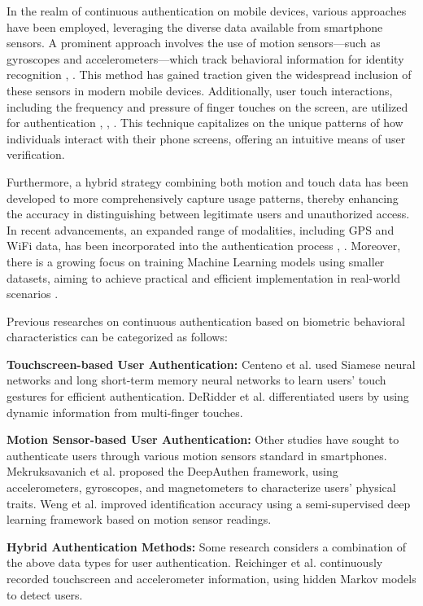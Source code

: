 In the realm of continuous authentication on mobile devices, various approaches have been employed, leveraging the diverse data available from smartphone sensors. A prominent approach involves the use of motion sensors—such as gyroscopes and accelerometers—which track behavioral information for identity recognition \cite{fereidooni2023authentisense}, \cite{centeno2018mobile}. This method has gained traction given the widespread inclusion of these sensors in modern mobile devices. Additionally, user touch interactions, including the frequency and pressure of finger touches on the screen, are utilized for authentication \cite{frank2012touchalytics}, \cite{xu2014towards}, \cite{zhao2013continuous}. This technique capitalizes on the unique patterns of how individuals interact with their phone screens, offering an intuitive means of user verification.

Furthermore, a hybrid strategy combining both motion and touch data has been developed to more comprehensively capture usage patterns, thereby enhancing the accuracy in distinguishing between legitimate users and unauthorized access. In recent advancements, an expanded range of modalities, including GPS and WiFi data, has been incorporated into the authentication process \cite{deb2019actions}, \cite{acien2019multilock}. Moreover, there is a growing focus on training Machine Learning models using smaller datasets, aiming to achieve practical and efficient implementation in real-world scenarios \cite{fereidooni2023authentisense}.


Previous researches on continuous authentication based on biometric behavioral characteristics can be categorized as follows:

\textbf{Touchscreen-based User Authentication:} Centeno et al.\cite{centeno2018mobile} used Siamese neural networks and long short-term memory neural networks to learn users' touch gestures for efficient authentication.
DeRidder et al.\cite{deridder2022continuous} differentiated users by using dynamic information from multi-finger touches.

\textbf{Motion Sensor-based User Authentication:} Other studies have sought to authenticate users through various motion sensors standard in smartphones. Mekruksavanich et al.\cite{mekruksavanich2021deep} proposed the DeepAuthen framework, using accelerometers, gyroscopes, and magnetometers to characterize users' physical traits.
Weng et al.\cite{weng2023enhancing} improved identification accuracy using a semi-supervised deep learning framework based on motion sensor readings.

\textbf{Hybrid Authentication Methods:} Some research considers a combination of the above data types for user authentication. Reichinger et al.\cite{reichinger2021continuous} continuously recorded touchscreen and accelerometer information, using hidden Markov models to detect users.

